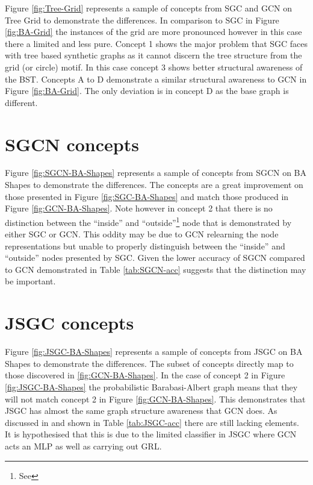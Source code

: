 Figure \ref{fig:Tree-Grid} represents a sample of concepts from SGC and GCN on Tree Grid to demonstrate the differences.
In comparison to SGC in Figure \ref{fig:BA-Grid} the instances of the grid are more pronounced however in this case there a limited and less pure.
Concept 1 shows the major problem that SGC faces with tree based synthetic graphs as it cannot discern the tree structure from the grid (or circle) motif.
In this case concept 3 shows better structural awareness of the BST.
Concepts A to D demonstrate a similar structural awareness to GCN in Figure \ref{fig:BA-Grid}.
The only deviation is in concept D as the base graph is different.

\section{SGCN concepts}


Figure \ref{fig:SGCN-BA-Shapes} represents a sample of concepts from SGCN on BA Shapes to demonstrate the differences.
The concepts are a great improvement on those presented in Figure \ref{fig:SGC-BA-Shapes} and match those produced in Figure \ref{fig:GCN-BA-Shapes}.
Note however in concept 2 that there is no distinction between the ``inside'' and ``outside''\footnote{See \Sref{}} node that is demonstrated by either SGC or GCN.
This oddity may be due to GCN relearning the node representations but unable to properly distinguish between the ``inside'' and ``outside'' nodes presented by SGC.
Given the lower accuracy of SGCN compared to GCN demonstrated in Table \ref{tab:SGCN-acc} suggests that the distinction may be important.

\section{JSGC concepts}


Figure \ref{fig:JSGC-BA-Shapes} represents a sample of concepts from JSGC on BA Shapes to demonstrate the differences.
The subset of concepts directly map to those discovered in \ref{fig:GCN-BA-Shapes}.
In the case of concept 2 in Figure \ref{fig:JSGC-BA-Shapes} the probabilistic Barabasi-Albert graph means that they will not match concept 2 in Figure \ref{fig:GCN-BA-Shapes}.
This demonstrates that JSGC has almost the same graph structure awareness that GCN does.
As discussed in  and shown in Table \ref{tab:JSGC-acc} there are still lacking elements.
It is hypothesised that this is due to the limited classifier in JSGC where GCN acts an MLP as well as carrying out GRL.
